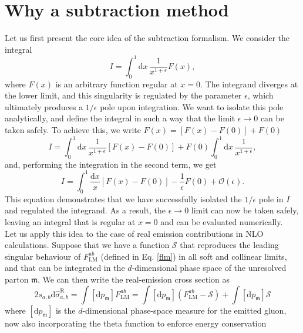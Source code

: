 \documentclass[a4paper, 12pt]{book}
\newcommand{\um}{\mathfrak{m}}
\begin{document}
\section{Why a subtraction method}
Let us first present the core idea of the subtraction formalism. We consider the integral
\begin{equation}
    I = \int_0^1 \mathrm{d}x \, \frac{1}{x^{1+\epsilon}} F(x),
\end{equation}
where $F(x)$ is an arbitrary function regular at $x=0$. The integrand diverges at the lower limit, and this singularity is regulated by the parameter $\epsilon$, which ultimately produces a $1/\epsilon$ pole upon integration. We want to isolate this pole analytically, and define the integral in such a way that the limit $\epsilon \to 0$ can be taken safely. To achieve this, we write $F(x)=[F(x)-F(0)]+F(0)$
\begin{equation}
    I = \int _0^1 \mathrm{d}x \, \frac{1}{x^{1+\epsilon}} [F(x)-F(0)]+F(0)\int_0^1 \mathrm{d}x \, \frac{1}{x^{1+\epsilon}},
\end{equation}
and, performing the integration in the second term, we get
\begin{equation}
    I = \int_0^1 \frac{\mathrm{d}x}{x}[F(x)-F(0)] - \frac{1}{\epsilon}F(0) + \mathcal{O}(\epsilon).
    \label{extraction-poles}
\end{equation}
This equation demonstrates that we have successfully isolated the $1/\epsilon$ pole in $I$ and regulated the integrand. As a result, the $\epsilon \to 0$ limit can now be taken safely, leaving an integral that is regular at $x=0$ and can be evaluated numerically.\\
Let us apply this idea to the case of real emission contributions in NLO calculations. Suppose that we have a function $\mathcal{S}$ that reproduces the leading singular behaviour of $F^{ab}_{\mathrm{LM}}$ (defined in Eq. \ref{flm}) in all soft and collinear limits, and that can be integrated in the $d$-dimensional phase space of the unresolved parton $\um$. We can then write the real-emission cross section as
\begin{equation}
    2s_{a,b} \mathrm{d} \hat{\sigma}_{a,b}^{\mathrm{R}} = \int [\mathrm{d}p_{\um}] F^{ab}_{\mathrm{LM}} = \int [\mathrm{d}p_{\um}] (F^{ab}_{\mathrm{LM}} - \mathcal{S}) + \int [\mathrm{d}p_{\um}] \mathcal{S}
    \label{subtraction-flm}
\end{equation}
where $[\mathrm{d}p_{\um}]$ is the $d$-dimensional phase-space measure for the emitted gluon, now also incorporating the theta function to enforce energy conservation
\end{document}
